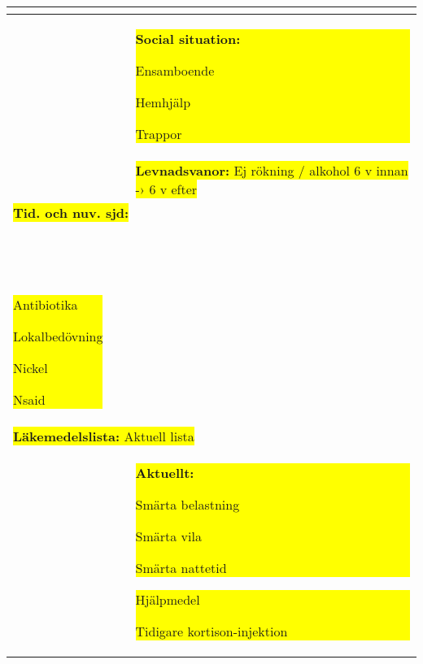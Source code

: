 \documentclass[13pt,a4paper,oneside]{article}
\def\comment{\colorbox{yellow}}{}
\begin{document}
{\begin{tabularx}{\textwidth}{p{15em} p{1.5cm}|X}
{\begin{minipage}{30cm}
\begin{itemize}
\end{itemize}\end{minipage}}\\
\hline & \ & \begin{minipage}{10cm} \comment{{\bf Social situation:}     \begin{htodolist}  
        \item Ensamboende
        \item Hemhjälp
        \item Trappor
    \end{htodolist}}\end{minipage}\\\
 \ & \ & \begin{minipage}{10cm}\comment{{\bf Levnadsvanor:} Ej rökning / alkohol 6 v innan -› 6 v efter}\end{minipage}\\
 \hline\multicolumn{3}{l}{\comment{\bf Tid. och nuv. sjd:}\vspace{3em}}\\
 \hline \ & \ & \begin{minipage}{10cm}\comment{{\bf Uppmärksamhetssignal:}}\\\ 
 \comment{
 \begin{htodolist}  
        \item Antibiotika
        \item Lokalbedövning
        \item Nickel
        \item {\sc Nsaid}
    \end{htodolist}}\end{minipage}\\
\hline\multicolumn{3}{l}{\comment{{\bf Läkemedelslista:} Aktuell lista}\vspace{3em}}\\
 \hline\ & \ & \begin{minipage}{10cm}\comment{{\bf Aktuellt:}
 \begin{htodolist}  
        \item Smärta belastning
        \item Smärta vila
        \item Smärta nattetid
\end{htodolist}}
 \comment{\begin{htodolist}
        \item Hjälpmedel
        \item Tidigare kortison-injektion
    \end{htodolist}}
    \end{minipage}\\

\end{tabularx}}
\end{document}
